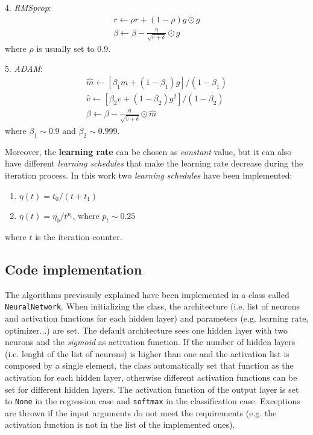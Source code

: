 \documentclass[english,notitlepage,reprint,nofootinbib]{revtex4-1}  %
\begin{document}
4. \textit{RMSprop}:
$$
\begin{array}{c}
r \leftarrow \rho r + (1-\rho) g \odot g \\
\beta \leftarrow \beta -\frac{\eta}{\sqrt{r+\delta}} \odot g
\end{array}
$$
where $\rho$ is usually set to $0.9$.

5. \textit{ADAM}:
$$
\begin{array}{c}
\hat{m} \leftarrow [\beta_1 m + (1-\beta_1) g] / (1-\beta_1) \\
\hat{v} \leftarrow [\beta_2 v + (1- \beta_2) g^2] / (1-\beta_2) \\
\beta \leftarrow \beta -\frac{\eta}{\sqrt{\hat{v}+\delta}} \odot \hat{m}
\end{array}
$$
where $\beta_1 \sim 0.9$ and $\beta_2 \sim 0.999
$.

Moreover, the \textbf{learning rate} can be chosen as \textit{constant} value, but it can also have different \textit{learning schedules} that make the learning rate decrease during the iteration process. In this work two \textit{learning schedules} have been implemented:
\begin{enumerate}
    \item $\eta(t) = t_0 / (t+t_1)$
    \item $\eta(t) = \eta_0 / t^{p_t}$, where $p_t \sim 0.25$
\end{enumerate}
where $t$ is the iteration counter.
\subsection{Code implementation}\label{sec:code}
The algorithms previously explained have been implemented in a class called \texttt{NeuralNetwork}. When initializing the class, the architecture (i.e. list of neurons and activation functions for each hidden layer) and parameters (e.g. learning rate, optimizer...) are set. The default architecture sees one hidden layer with two neurons and the  \textit{sigmoid} as activation function. If the number of hidden layers (i.e. lenght of the list of neurons) is higher than one and the activation list is composed by a single element, the class automatically set that function as the activation for each hidden layer, otherwise different activation functions can be set for different hidden layers. The activation function of the output layer is set to \texttt{None} in the regression case and \texttt{softmax} in the classification case. Exceptions are thrown if the input arguments do not meet the requirements (e.g. the activation function is not in the list of the implemented ones).
\end{document}
